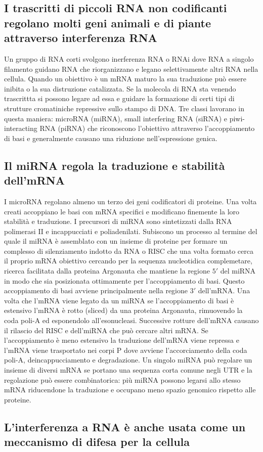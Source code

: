 \subsection{I trascritti di piccoli RNA non codificanti regolano molti geni animali e di piante attraverso interferenza RNA}
Un gruppo di RNA corti svolgono inerferenza RNA o RNAi dove RNA a singolo filamento guidano RNA che riorganizzano e legano selettivamente altri RNA nella cellula. Quando un obiettivo \`e
un mRNA maturo la sua traduzione pu\`o essere inibita o la sua distruzione catalizzata. Se la molecola di RNA sta venendo trascrittta si possono legare ad essa e guidare la formazione
di certi tipi di strutture cromatiniche repressive sullo stampo di DNA. Tre classi lavorano in questa maniera: microRNA (miRNA), small interfering RNA (siRNA) e piwi-interacting RNA
(piRNA) che riconoscono l'obiettivo attraverso l'accoppiamento di basi e generalmente causano una riduzione nell'espressione genica.
\subsection{Il miRNA regola la traduzione e stabilit\`a dell'mRNA}
I microRNA regolano almeno un terzo dei geni codificatori di proteine. Una volta creati accoppiano le basi con mRNA specifici e modificano finemente la loro stabilit\`a e traduzione.
I precursori di miRNA sono sintetizzati dalla RNA polimerasi II e incappucciati e poliadenilati. Subiscono un processo al termine del quale il miRNA \`e assemblato con un insieme di
proteine per formare un complesso di silenziamento indotto da RNA o RISC che una volta formato cerca il proprio mRNA obiettivo cercando per la sequenza nucleotidica complemetare,
ricerca facilitata dalla proteina Argonauta che mantiene la regione $5'$ del miRNA in modo che sia posizionata ottimamente per l'accoppiamento di basi. Questo accoppiamento di basi 
avviene principalmente nella regione $3'$ dell'mRNA. Una volta che l'mRNA viene legato da un miRNA se l'accoppiamento di basi \`e estensivo l'mRNA \`e rotto (sliced) da una proteina
Argonauta, rimuovendo  la coda poli-A ed esponendolo all'esonucleasi. Successive rotture dell'mRNA causano il rilascio del RISC e dell'miRNA che pu\`o cercare altri mRNA. Se 
l'accoppiamento \`e meno estensivo la traduzione dell'mRNA viene repressa e l'mRNA viene trasportato nei corpi P dove avviene l'accorciamento della coda poli-A, deincappucciamento e 
degradazione. Un singolo miRNA pu\`o regolare un insieme di diversi mRNA se portano una sequenza corta comune negli UTR e la regolazione pu\`o essere combinatorica: pi\`u miRNA possono
legarsi allo stesso mRNA riducendone la traduzione e occupano meno spazio genomico rispetto alle proteine.
\subsection{L'interferenza a RNA \`e anche usata come un meccanismo di difesa per la cellula}
